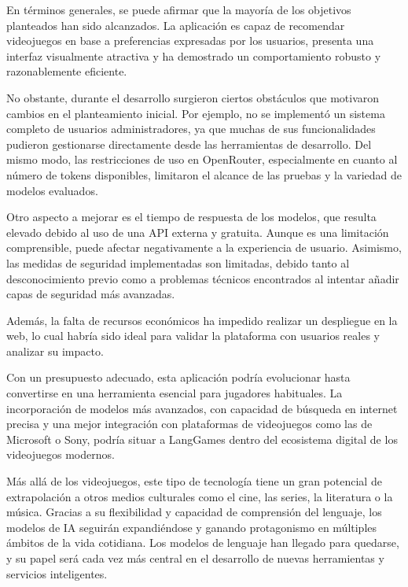 En términos generales, se puede afirmar que la mayoría de los objetivos planteados han sido alcanzados. La aplicación es capaz de recomendar videojuegos en base a preferencias expresadas por los usuarios, presenta una interfaz visualmente atractiva y ha demostrado un comportamiento robusto y razonablemente eficiente.

No obstante, durante el desarrollo surgieron ciertos obstáculos que motivaron cambios en el planteamiento inicial. Por ejemplo, no se implementó un sistema completo de usuarios administradores, ya que muchas de sus funcionalidades pudieron gestionarse directamente desde las herramientas de desarrollo. Del mismo modo, las restricciones de uso en OpenRouter, especialmente en cuanto al número de tokens disponibles, limitaron el alcance de las pruebas y la variedad de modelos evaluados.

Otro aspecto a mejorar es el tiempo de respuesta de los modelos, que resulta elevado debido al uso de una API externa y gratuita. Aunque es una limitación comprensible, puede afectar negativamente a la experiencia de usuario. Asimismo, las medidas de seguridad implementadas son limitadas, debido tanto al desconocimiento previo como a problemas técnicos encontrados al intentar añadir capas de seguridad más avanzadas.

Además, la falta de recursos económicos ha impedido realizar un despliegue en la web, lo cual habría sido ideal para validar la plataforma con usuarios reales y analizar su impacto.

Con un presupuesto adecuado, esta aplicación podría evolucionar hasta convertirse en una herramienta esencial para jugadores habituales. La incorporación de modelos más avanzados, con capacidad de búsqueda en internet precisa y una mejor integración con plataformas de videojuegos como las de Microsoft o Sony, podría situar a LangGames dentro del ecosistema digital de los videojuegos modernos.

Más allá de los videojuegos, este tipo de tecnología tiene un gran potencial de extrapolación a otros medios culturales como el cine, las series, la literatura o la música. Gracias a su flexibilidad y capacidad de comprensión del lenguaje, los modelos de IA seguirán expandiéndose y ganando protagonismo en múltiples ámbitos de la vida cotidiana. Los modelos de lenguaje han llegado para quedarse, y su papel será cada vez más central en el desarrollo de nuevas herramientas y servicios inteligentes.

\newpage

